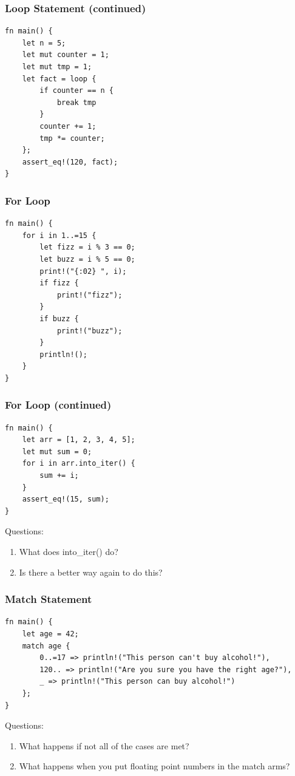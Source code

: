\documentclass{slides}
\begin{document}
\begin{frame}[fragile]
\frametitle{Loop Statement (continued)}
\begin{verbatim}
fn main() {
    let n = 5;
    let mut counter = 1;
    let mut tmp = 1;
    let fact = loop {
        if counter == n {
            break tmp
        }
        counter += 1;
        tmp *= counter;
    };
    assert_eq!(120, fact);
}
\end{verbatim}
\end{frame}

\begin{frame}[fragile]
\frametitle{For Loop}
\begin{verbatim}
fn main() {
    for i in 1..=15 {
        let fizz = i % 3 == 0;
        let buzz = i % 5 == 0;
        print!("{:02} ", i);
        if fizz {
            print!("fizz");
        }
        if buzz {
            print!("buzz");
        }
        println!();
    }
}
\end{verbatim}
\end{frame}

\begin{frame}[fragile]
\frametitle{For Loop (continued)}
\begin{verbatim}
fn main() {
    let arr = [1, 2, 3, 4, 5];
    let mut sum = 0;
    for i in arr.into_iter() {
        sum += i;
    }
    assert_eq!(15, sum);
}
\end{verbatim}
Questions:
\begin{enumerate}
    \item What does into\_iter() do?
    \item Is there a better way again to do this?
\end{enumerate}
\end{frame}

\begin{frame}[fragile]
\frametitle{Match Statement}
\begin{verbatim}
fn main() {
    let age = 42;
    match age {
        0..=17 => println!("This person can't buy alcohol!"),
        120.. => println!("Are you sure you have the right age?"),
        _ => println!("This person can buy alcohol!")
    };
}
\end{verbatim}
Questions:
\begin{enumerate}
    \item What happens if not all of the cases are met?
    \item What happens when you put floating point numbers in the match arms?
\end{enumerate}
\end{frame}
\end{document}
